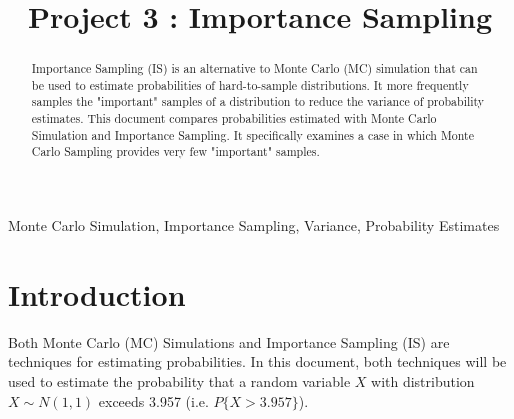 \documentclass[conference]{IEEEtran}
\begin{document}
\title{Project 3 : Importance Sampling}

\author{
}
\maketitle

\begin{abstract}
Importance Sampling (IS) is an alternative to Monte Carlo (MC) simulation that can be used to estimate probabilities of hard-to-sample distributions. It more frequently samples the "important" samples of a distribution to reduce the variance of probability estimates. This document compares probabilities estimated with Monte Carlo Simulation and Importance Sampling. It specifically examines a case in which Monte Carlo Sampling provides very few "important" samples.
\end{abstract}

\begin{IEEEkeywords}
Monte Carlo Simulation, Importance Sampling,  Variance, Probability Estimates
\end{IEEEkeywords}

\section{Introduction}
Both Monte Carlo (MC) Simulations and Importance Sampling (IS) are techniques for estimating probabilities. In this document, both techniques will be used to estimate the probability that a random variable $X$ with distribution $X\sim N(1,1)$ exceeds 3.957 (i.e. $P\{X > 3.957\}$).
\end{document}
